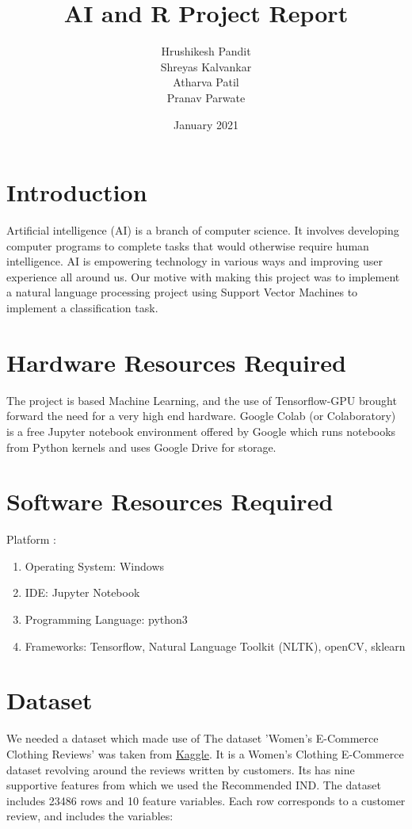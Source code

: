 \documentclass{article}
\title{AI and R Project Report}
\author{Hrushikesh Pandit\\
Shreyas Kalvankar\\
Atharva Patil\\
Pranav Parwate
}
\date{January 2021}
\begin{document}
\maketitle

\section{Introduction}
    Artificial intelligence (AI) is a branch of computer science. It involves developing computer programs to complete tasks that would otherwise require human intelligence. AI is empowering technology in various ways and improving user experience all around us. Our motive with making this project was to implement a natural language processing project using Support Vector Machines to implement a classification task.


\section{Hardware Resources Required}
The project is based Machine Learning, and the use of Tensorflow-GPU brought forward the need for a very high end hardware. Google Colab (or Colaboratory) is a free Jupyter notebook environment offered by Google which runs notebooks from Python kernels and uses Google Drive for storage.


\pagebreak

\section{Software Resources Required}
Platform :
\begin{enumerate}
\item Operating System: Windows
\item IDE: Jupyter Notebook
\item Programming Language: python3
\item Frameworks: Tensorflow, Natural Language Toolkit (NLTK), openCV, sklearn
\end{enumerate}

\section{Dataset}
We needed a dataset which made use of The dataset 'Women's E-Commerce Clothing Reviews' was taken from \href{https://www.kaggle.com/nicapotato/womens-ecommerce-clothing-reviews}{Kaggle}. It is a Women’s Clothing E-Commerce dataset revolving around the reviews written by customers. Its has nine supportive features from which we used the Recommended IND.
The dataset includes 23486 rows and 10 feature variables. Each row corresponds to a customer review, and includes the variables:\\
\end{document}

